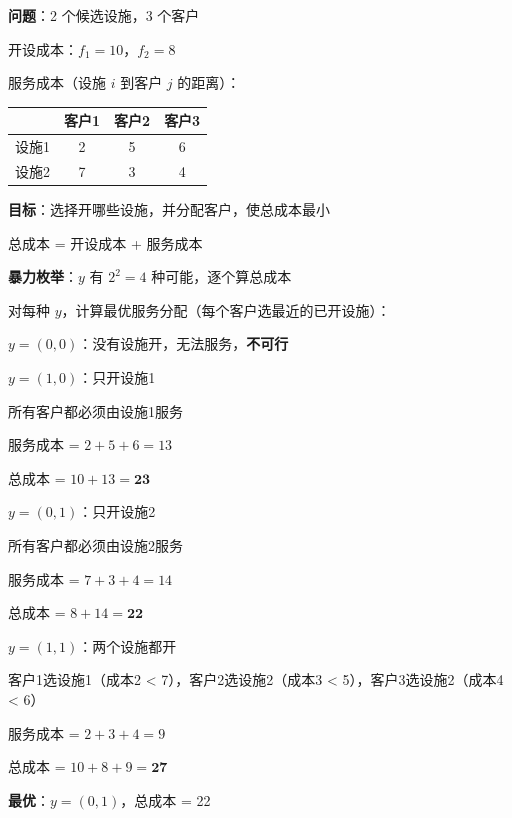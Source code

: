 \documentclass[12pt, a4paper]{ctexart}
\begin{document}
\begin{blackboard}[一个具体的小例子]

\textbf{问题}：2 个候选设施，3 个客户

开设成本：$f_1 = 10$，$f_2 = 8$

服务成本（设施 $i$ 到客户 $j$ 的距离）：
\begin{center}
\begin{tabular}{c|ccc}
& 客户1 & 客户2 & 客户3 \\
\hline
设施1 & 2 & 5 & 6 \\
设施2 & 7 & 3 & 4
\end{tabular}
\end{center}

\textbf{目标}：选择开哪些设施，并分配客户，使总成本最小

总成本 = 开设成本 + 服务成本

\textbf{暴力枚举}：$y$ 有 $2^2 = 4$ 种可能，逐个算总成本

\end{blackboard}

\begin{blackboard}[暴力枚举的结果]

对每种 $y$，计算最优服务分配（每个客户选最近的已开设施）：

\textbf{$y = (0, 0)$}：没有设施开，无法服务，\textbf{不可行}

\textbf{$y = (1, 0)$}：只开设施1

所有客户都必须由设施1服务

服务成本 = $2 + 5 + 6 = 13$

总成本 = $10 + 13 = \mathbf{23}$

\textbf{$y = (0, 1)$}：只开设施2

所有客户都必须由设施2服务

服务成本 = $7 + 3 + 4 = 14$

总成本 = $8 + 14 = \mathbf{22}$

\textbf{$y = (1, 1)$}：两个设施都开

客户1选设施1（成本2 < 7），客户2选设施2（成本3 < 5），客户3选设施2（成本4 < 6）

服务成本 = $2 + 3 + 4 = 9$

总成本 = $10 + 8 + 9 = \mathbf{27}$

\textbf{最优}：$y = (0, 1)$，总成本 = 22

\end{blackboard}
\end{document}
